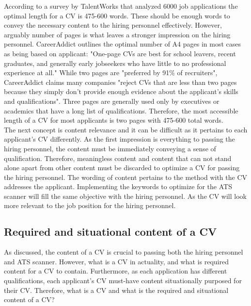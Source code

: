 According to a survey by TalentWorks that analyzed 6000 job applications the optimal length for a CV is 475-600 words.\cite{CV_Word_length}
These should be enough words to convey the necessary content to the hiring personnel effectively. 
However, arguably number of pages is what leaves a stronger impression on the hiring personnel.
CareerAddict outlines the optimal number of A4 pages in most cases as being based on applicant:\cite{CV_Page_length}
"One-page CVs are best for school leavers, recent graduates, and generally early jobseekers who have little to no professional experience at all."\cite{CV_Page_length}
While two pages are "preferred by 91\% of recruiters", CareerAddict claims many companies "reject CVs that are less than two pages because they simply don’t provide enough evidence about the applicant’s skills and qualifications".\cite{CV_Page_length}
Three pages are generally used only by executives or academics that have a long list of qualifications.
Therefore, the most accessible length of a CV for most applicants is two pages with 475-600 total words. \\

The next concept is content relevance and it can be difficult as it pertains to each applicant's CV differently.
As the first impression is everything to passing the hiring personnel, the content must be immediately conveying a sense of qualification.
Therefore, meaningless content and content that can not stand alone apart from other content must be discarded to optimize a CV for passing the hiring personnel.
The wording of content pertains to the method with the CV addresses the applicant.
Implementing the keywords to optimize for the ATS scanner will fill the same objective with the hiring personnel.
As the CV will look more relevant to the job position for the hiring personnel.\\

\subsection{Required and situational content of a CV} \label{Required and situational content of a CV}
As discussed, the content of a CV is crucial to passing both the hiring personnel and ATS scanner.
However, what is a CV in actuality, and what is required content for a CV to contain.
Furthermore, as each application has different qualifications, each applicant's CV must-have content situationally purposed for their CV.
Therefore, what is a CV and what is the required and situational content of a CV? \\

